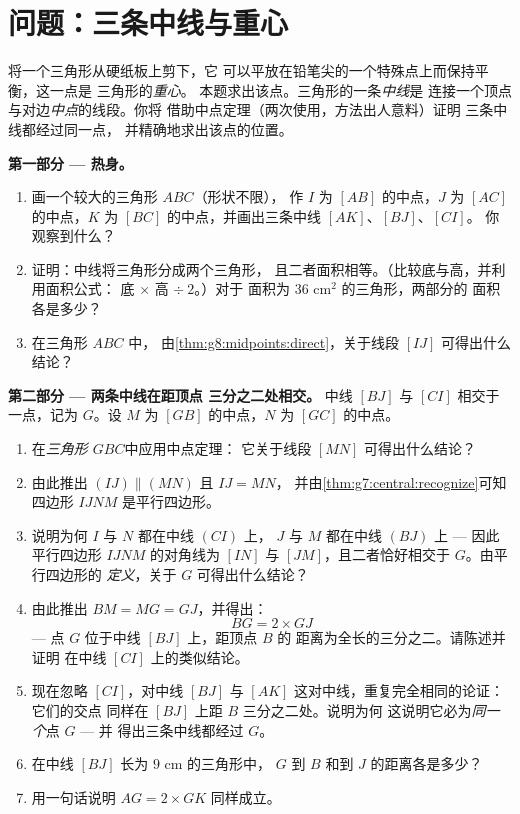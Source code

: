 \section{问题：三条中线与重心}

\begin{problem}
\label{pb:g8:midpoints:1}
将一个三角形从硬纸板上剪下，它
可以平放在铅笔尖的一个特殊点上而保持平衡，这一点是
三角形的\emph{重心}。
本题求出该点。三角形的一条\emph{中线}是
连接一个顶点与对边\emph{中点}的线段。你将
借助中点定理（两次使用，方法出人意料）证明
三条中线都经过同一点，
并精确地求出该点的位置。

\medskip
\noindent\textbf{第一部分 --- 热身。}
\begin{enumerate}
  \item 画一个较大的三角形 $ABC$（形状不限），
        作 $I$ 为 $[AB]$ 的中点，$J$ 为 $[AC]$ 的中点，$K$ 为
        $[BC]$ 的中点，并画出三条中线 $[AK]$、$[BJ]$、$[CI]$。
        你观察到什么？
  \item 证明：中线将三角形分成两个三角形，
        且二者面积相等。（比较底与高，并利用面积公式：
        底 $\times$ 高 $\div\ 2$。）对于
        面积为 $36$ cm$^2$ 的三角形，两部分的
        面积各是多少？
  \item 在三角形 $ABC$ 中，
        由\cref{thm:g8:midpoints:direct}，关于线段
        $[IJ]$ 可得出什么结论？
\end{enumerate}

\medskip
\noindent\textbf{第二部分 --- 两条中线在距顶点
三分之二处相交。}
中线 $[BJ]$ 与 $[CI]$ 相交于一点，记为 $G$。设
$M$ 为 $[GB]$ 的中点，$N$ 为 $[GC]$ 的中点。
\begin{enumerate}[resume]
  \item 在\emph{三角形 $GBC$}中应用中点定理：
        它关于线段 $[MN]$ 可得出什么结论？
  \item 由此推出 $(IJ) \parallel (MN)$ 且 $IJ = MN$，
        并由\cref{thm:g7:central:recognize}可知
        四边形 $IJNM$ 是平行四边形。
  \item 说明为何 $I$ 与 $N$ 都在中线 $(CI)$ 上，
        $J$ 与 $M$ 都在中线 $(BJ)$ 上 --- 因此
        平行四边形 $IJNM$ 的对角线为 $[IN]$ 与
        $[JM]$，且二者恰好相交于 $G$。由平行四边形的
        \emph{定义}，关于 $G$ 可得出什么结论？
  \item 由此推出 $BM = MG = GJ$，并得出：
        \[
        BG = 2 \times GJ
        \]
        --- 点 $G$ 位于中线 $[BJ]$ 上，距顶点 $B$ 的
        距离为全长的三分之二。请陈述并证明
        在中线 $[CI]$ 上的类似结论。
  \item 现在忽略 $[CI]$，对中线 $[BJ]$ 与 $[AK]$
        这对中线，重复完全相同的论证：它们的交点
        同样在 $[BJ]$ 上距 $B$ 三分之二处。说明为何
        这说明它必为\emph{同一个}点 $G$ --- 并
        得出三条中线都经过 $G$。
  \item 在中线 $[BJ]$ 长为 $9$ cm 的三角形中，
        $G$ 到 $B$ 和到 $J$ 的距离各是多少？
  \item 用一句话说明 $AG = 2 \times GK$ 同样成立。
\end{enumerate}


\end{problem}
